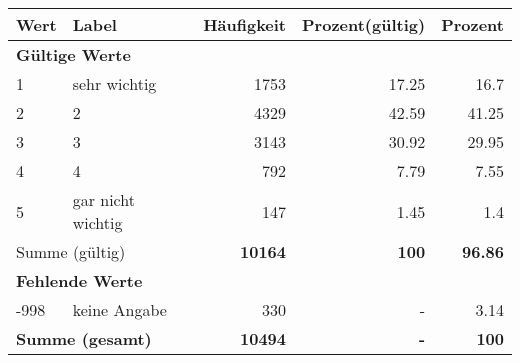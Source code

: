      \begin{longtable}{lXrrr}
     \toprule
     \textbf{Wert} & \textbf{Label} & \textbf{Häufigkeit} & \textbf{Prozent(gültig)} & \textbf{Prozent} \\
     \endhead
     \midrule
     \multicolumn{5}{l}{\textbf{Gültige Werte}}\\

     1 &
     \multicolumn{1}{X}{ sehr wichtig   } &


       \num{1753} &
       \num[round-mode=places,round-precision=2]{17.25} &
         \num[round-mode=places,round-precision=2]{16.7} \\

     2 &
     \multicolumn{1}{X}{ 2   } &


       \num{4329} &
       \num[round-mode=places,round-precision=2]{42.59} &
         \num[round-mode=places,round-precision=2]{41.25} \\

     3 &
     \multicolumn{1}{X}{ 3   } &


       \num{3143} &
       \num[round-mode=places,round-precision=2]{30.92} &
         \num[round-mode=places,round-precision=2]{29.95} \\

     4 &
     \multicolumn{1}{X}{ 4   } &


       \num{792} &
       \num[round-mode=places,round-precision=2]{7.79} &
         \num[round-mode=places,round-precision=2]{7.55} \\

     5 &
     \multicolumn{1}{X}{ gar nicht wichtig   } &


       \num{147} &
       \num[round-mode=places,round-precision=2]{1.45} &
         \num[round-mode=places,round-precision=2]{1.4} \\
     \midrule
     \multicolumn{2}{l}{Summe (gültig)} &
       \textbf{\num{10164}} &
     \textbf{\num{100}} &
       \textbf{\num[round-mode=places,round-precision=2]{96.86}} \\
     \multicolumn{5}{l}{\textbf{Fehlende Werte}}\\
       -998 &
       keine Angabe &
         \num{330} &
        - &
         \num[round-mode=places,round-precision=2]{3.14} \\
     \midrule
     \multicolumn{2}{l}{\textbf{Summe (gesamt)}} &
          \textbf{\num{10494}} &
        \textbf{-} &
        \textbf{\num{100}} \\
     \bottomrule
     \end{longtable}
     

